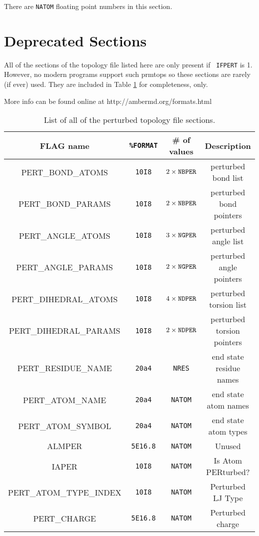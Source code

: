\noindent There are {\tt NATOM} floating point numbers in this section.


\section{Deprecated Sections}

All of the sections of the topology file listed here are only present if {\tt
IFPERT} is 1. However, no modern programs support such prmtops so these sections
are rarely (if ever) used. They are included in Table \ref{tblB:PertSections}
for completeness, only.

More info can be found online at http://ambermd.org/formats.html

\begin{table}
   \caption{List of all of the perturbed topology file sections.}
   \begin{tabular}{|c|c|c|c|}
      \hline
      FLAG name & {\tt \%FORMAT} & # of values & Description \\
      \hline
      PERT\_BOND\_ATOMS & {\tt 10I8} &  $2 \times {\tt NBPER}$ & perturbed bond
         list \\
      PERT\_BOND\_PARAMS & {\tt 10I8} & $2 \times {\tt NBPER}$ & perturbed bond
         pointers \\
      PERT\_ANGLE\_ATOMS & {\tt 10I8} & $3 \times {\tt NGPER}$ & perturbed angle
         list \\
      PERT\_ANGLE\_PARAMS & {\tt 10I8} & $2 \times {\tt NGPER}$ & perturbed
         angle pointers \\
      PERT\_DIHEDRAL\_ATOMS & {\tt 10I8} & $4 \times {\tt NDPER}$ & perturbed
         torsion list \\
      PERT\_DIHEDRAL\_PARAMS & {\tt 10I8} & $2 \times {\tt NDPER}$ & perturbed
         torsion pointers \\
      PERT\_RESIDUE\_NAME & {\tt 20a4} & {\tt NRES} & end state residue names \\
      PERT\_ATOM\_NAME & {\tt 20a4} & {\tt NATOM} & end state atom names \\
      PERT\_ATOM\_SYMBOL & {\tt 20a4} & {\tt NATOM} & end state atom types \\
      ALMPER & {\tt 5E16.8} & {\tt NATOM} & Unused \\
      IAPER & {\tt 10I8} & {\tt NATOM} & Is Atom PERturbed? \\
      PERT\_ATOM\_TYPE\_INDEX & {\tt 10I8} & {\tt NATOM} &
         Perturbed LJ Type \\
      PERT\_CHARGE & {\tt 5E16.8} & {\tt NATOM} & Perturbed charge \\
      \hline
   \end{tabular}
   \label{tblB:PertSections}
\end{table}

